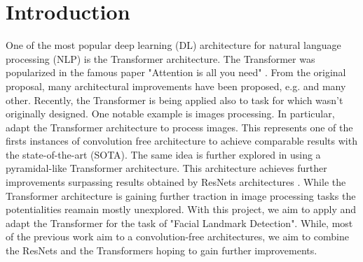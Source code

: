 \section{Introduction}\label{sects:introduction}

One of the most popular deep learning (DL) architecture for natural language processing (NLP) is the Transformer architecture. The Transformer was popularized in the famous paper "Attention is all you need" \cite{Vaswani17}. From the original proposal, many architectural improvements have been proposed, e.g. \cite{Devlin18, Liu19, Yang19} and many other. Recently, the Transformer is being applied also to task for which wasn't originally designed. One notable example is images processing. In particular, \cite{Dosovitskiy20} adapt the Transformer architecture to process images. This represents one of the firsts instances of convolution free architecture to achieve comparable results with the state-of-the-art (SOTA). The same idea is further explored in \cite{Wang21} using a pyramidal-like Transformer architecture. This architecture achieves further improvements surpassing results obtained by ResNets architectures \cite{He16}. While the Transformer architecture is gaining further traction in image processing tasks the potentialities reamain mostly unexplored. With this project, we aim to apply and adapt the Transformer for the task of "Facial Landmark Detection". While, most of the previous work aim to a convolution-free architectures, we aim to combine the ResNets and the Transformers hoping to gain further improvements.

